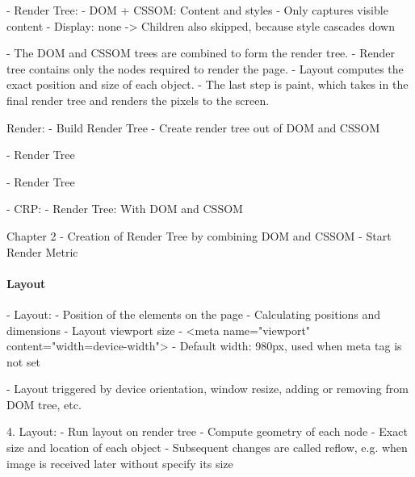 - Render Tree:
	- DOM + CSSOM: Content and styles
	- Only captures visible content
	- Display: none -> Children also skipped, because style cascades down
	
	
- The DOM and CSSOM trees are combined to form the render tree.
- Render tree contains only the nodes required to render the page.
- Layout computes the exact position and size of each object.
- The last step is paint, which takes in the final render tree and renders the pixels to the screen.


Render:
- Build Render Tree
- Create render tree out of DOM and CSSOM


- Render Tree


- Render Tree




- CRP:
- Render Tree: With DOM and CSSOM



Chapter 2
- Creation of Render Tree by combining DOM and CSSOM
- Start Render Metric






\paragraph{Layout}



- Layout:
	- Position of the elements on the page
	- Calculating positions and dimensions
	- Layout viewport size
	- <meta name="viewport" content="width=device-width">
	- Default width: 980px, used when meta tag is not set

	- Layout triggered by device orientation, window resize, adding or removing from DOM tree, etc.
	

4. Layout:
- Run layout on render tree
- Compute geometry of each node
- Exact size and location of each object
- Subsequent changes are called reflow, e.g. when image is received later without specify its size


